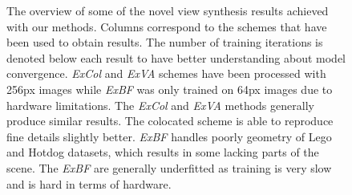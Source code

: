 \begin{figure}[!htb]
\begin{tabular*}{\textwidth}{ c c c c }
    \end{tabular*}
    \caption{The overview of some
    of the novel view synthesis results achieved with our methods.
    Columns correspond to the schemes that have been used to obtain results.
    The number of training iterations is denoted below each result to have better understanding about model convergence.
    \textit{ExCol} and \textit{ExVA} schemes have been processed with 256px images
    while \textit{ExBF} was only trained on 64px images due to hardware limitations.
    The \textit{ExCol} and \textit{ExVA} methods generally produce similar results.
    The colocated scheme is able to reproduce fine details slightly better.
    \textit{ExBF} handles poorly geometry of Lego and Hotdog datasets,
    which results in some lacking parts of the scene.
    The \textit{ExBF} are generally underfitted as training is very slow and is hard in terms of hardware.}
    \label{tab:coloc_allresults}
\end{figure}
\endgroup